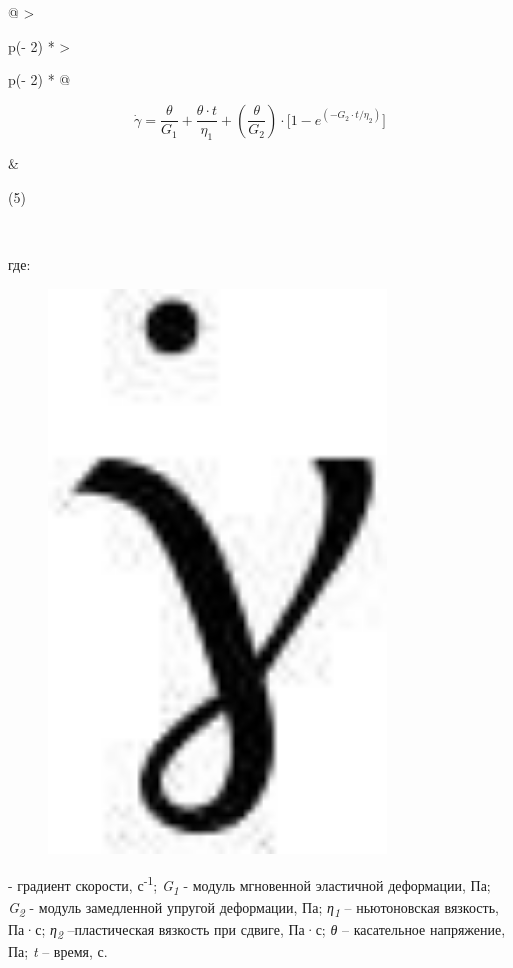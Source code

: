 \begin{longtable}[]{@{}
  >{\raggedright\arraybackslash}p{(\columnwidth - 2\tabcolsep) * }
  >{\raggedright\arraybackslash}p{(\columnwidth - 2\tabcolsep) * }@{}}
\toprule\noalign{}
\begin{minipage}[b]{\linewidth}\raggedright
\[\dot{\gamma} = \frac{\theta}{G_{1}} + \frac{\theta \cdot t}{\eta_{1}} + (\frac{\theta}{G_{2}}) \cdot \lbrack 1 - e^{( - G_{2} \cdot t/\eta_{2})}\rbrack\]
\end{minipage} & \begin{minipage}[b]{\linewidth}\raggedright
(5)
\end{minipage} \\
\midrule\noalign{}
\endhead
\bottomrule\noalign{}
\endlastfoot
\end{longtable}

где: \begin{figure}[H]
	\centering
	\includegraphics[width=0.8\textwidth]{assets/322}
	\caption*{}
\end{figure} - градиент скорости,
с\textsuperscript{-1}; \emph{G\textsubscript{1}} - модуль мгновенной
эластичной деформации, Па; \emph{G\textsubscript{2}} - модуль
замедленной упругой деформации, Па; \emph{η\textsubscript{1}} --
ньютоновская вязкость, Па·с; \emph{η\textsubscript{2}} --пластическая
вязкость при сдвиге, Па·с; \emph{θ} -- касательное напряжение, Па;
\emph{t} -- время, с.


